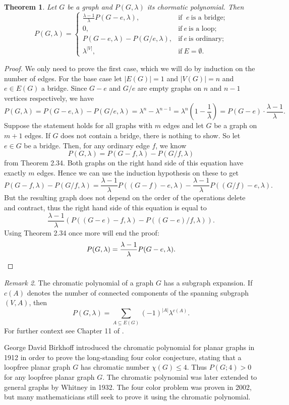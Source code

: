 \documentclass[12pt,a4paper, twoside, autooneside=false]{scrartcl}
\newtheorem{theorem}{Theorem}[section]
\theoremstyle{definition}
\theoremstyle{remark}
\newtheorem{remark}[theorem]{Remark}
\numberwithin{equation}{section}
\begin{document}
\begin{theorem}
Let $G$ be a graph and $P(G,\lambda)$ its chormatic polynomial. Then 
\[
P(G, \lambda) = \begin{cases}
\frac{\lambda - 1}{\lambda} P(G - e, \lambda), & \text{if } \ e \ \text{is a bridge;} \\
0, & \text{if} \ e \ \text{is a loop;} \\
P(G - e, \lambda) - P(G / e, \lambda), & \text{if} \ e \ \text{is ordinary;} \\
\lambda^{|V|}, & \text{if} \ E = \emptyset.
\end{cases}
\]
\end{theorem}
\begin{proof}
We only need to prove the first case, which we will do by induction on the number of edges. For the base case let $|E(G)| = 1$ and $|V(G)| = n$ and $e \in E(G)$ a bridge. Since $G - e$ and $G / e$ are empty graphs on $n$ and $n - 1$ vertices respectively, we have
\[
P(G, \lambda) = P(G - e, \lambda) - P(G / e, \lambda) = \lambda^{n}  - \lambda^{n - 1} = \lambda^n \left(1 - \frac{1}{\lambda}\right) = P(G - e) \cdot \frac{\lambda - 1}{\lambda}.
\]
Suppose the statement holds for all graphs with $m$ edges and let $G$ be a graph on $m + 1$ edges. If $G$ does not contain a bridge, there is nothing to show. So let $e \in G$ be a bridge. Then, for any ordinary edge $f$, we know 
\[
P(G, \lambda) = P(G - f, \lambda) - P(G / f, \lambda)
\]
from Theorem 2.34. Both graphs on the right hand side of this equation have exactly $m$ edges. Hence we can use the induction hypothesis on these to get
\[
P(G - f, \lambda) - P(G / f, \lambda) = \frac{\lambda - 1}{\lambda} P((G - f) - e, \lambda) - \frac{\lambda - 1}{\lambda} P((G / f) - e,\lambda).
\]
But the resulting graph does not depend on the order of the operations delete and contract, thus the right hand side of this equation is equal to
\[
 \frac{\lambda - 1}{\lambda } (P((G - e)- f, \lambda) - P((G - e) /f, \lambda)).
\]
Using Theorem 2.34 once more will end the proof:
\[
P(G, \lambda) = \frac{\lambda - 1}{\lambda} P(G - e, \lambda). \qedhere
\]
\end{proof}
\begin{remark}
The chromatic polynomial of a graph $G$ has a subgraph expansion. If $c(A)$ denotes the number of connected components of the spanning subgraph $(V,A)$, then 
\[
P(G,\lambda) = \sum_{A \subseteq E(G)} (-1)^{|A|} \lambda^{c(A)}.
\] For further context see Chapter 11 of \cite{ElMo2022}. 
\end{remark}
George David Birkhoff introduced the chromatic polynomial for planar graphs in 1912 in order to prove the long-standing four color conjecture, stating that a loopfree planar graph $G$ has chromatic number $\chi(G) \leq 4$. Thus $P(G;4) > 0$ for any loopfree planar graph $G$. The chromatic polynomial was later extended to general graphs by Whitney in 1932. The four color problem was proven in 2002, but many mathematicians still seek to prove it using the chromatic polynomial.
\end{document}
